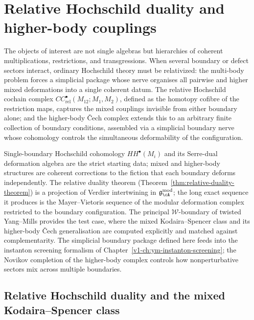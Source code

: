 \chapter{Relative Hochschild duality and higher-body couplings}
\label{v1-ch:ym-higher-body-couplings}


The objects of interest are not single algebras but hierarchies of coherent
multiplications, restrictions, and transgressions. When several boundary
or defect sectors interact, ordinary Hochschild theory must be
relativized: the multi-body problem forces a simplicial package whose
nerve organises all pairwise and higher mixed deformations into a single
coherent datum. The relative Hochschild cochain complex
$CC^\bullet_{\mathrm{rel}}(M_{12};M_1,M_2)$, defined as the
homotopy cofibre of the restriction maps, captures the mixed
couplings invisible from either boundary alone; and the higher-body
\v{C}ech complex extends this to an arbitrary finite collection of
boundary conditions, assembled via a simplicial boundary nerve whose
cohomology controls the simultaneous deformability of the configuration.

Single-boundary Hochschild cohomology $HH^\bullet(M_i)$ and its
Serre-dual deformation algebra are the strict starting data; mixed and
higher-body structures are coherent corrections to the fiction that each
boundary deforms independently. The relative duality theorem
(Theorem~\ref{thm:relative-duality-theorem}) is a projection of Verdier
intertwining in $\mathfrak{g}^{\mathrm{mod}}_\cA$; the long exact
sequence it produces is the Mayer--Vietoris sequence of the modular
deformation complex restricted to the boundary configuration. The
principal $\mathcal{W}$-boundary of twisted Yang--Mills provides the
test case, where the mixed Kodaira--Spencer class and its higher-body
\v{C}ech generalisation are computed explicitly and matched against
complementarity. The simplicial boundary package defined here feeds into
the instanton screening formalism of
Chapter~\ref{v1-ch:ym-instanton-screening}; the Novikov completion of the
higher-body complex controls how nonperturbative sectors mix across
multiple boundaries.

\section{Relative Hochschild duality and the mixed Kodaira--Spencer class}
\label{sec:relative-hochschild-mixed-ks}

